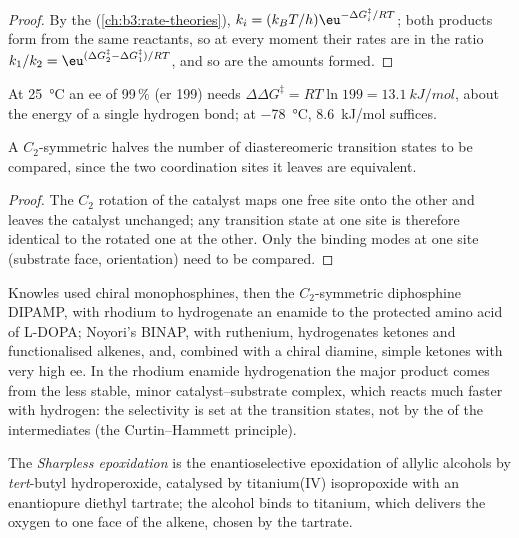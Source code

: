 \begin{proof}
By the  (\cref{ch:b3:rate-theories}),
$k_i = (k_BT/h)\eu^{-\Delta G_i^\ddagger/RT}$; both products form from the same reactants, so at every moment
their rates are in the ratio $k_1/k_2 = \eu^{(\Delta G_2^\ddagger - \Delta G_1^\ddagger)/RT}$, and so are the amounts formed.
\end{proof}

At \qty{25}{\celsius} an ee of 99\,\% (er 199) needs $\Delta\Delta G^\ddagger = RT\ln 199 = \qty{13.1}{kJ/mol}$, about the energy of a
single hydrogen bond; at \qty{-78}{\celsius}, \qty{8.6}{kJ/mol} suffices.

\begin{proposition}\label{prop:b3:asymmetric-synthesis:c2}
A $C_2$-symmetric  halves the number of diastereomeric transition
states to be compared, since the two coordination sites it leaves are
equivalent.
\end{proposition}

\begin{proof}
The $C_2$ rotation of the catalyst maps one free site onto the other and leaves the
catalyst unchanged; any transition state at one site is therefore identical to
the rotated one at the other. Only the binding modes at one site (substrate face,
orientation) need to be compared.
\end{proof}

Knowles used chiral monophosphines, then the $C_2$-symmetric diphosphine DIPAMP, with rhodium to
hydrogenate an enamide to the protected amino acid of L-DOPA; Noyori's BINAP,
with ruthenium, hydrogenates ketones and functionalised alkenes, and,
combined with a chiral diamine, simple ketones with very high ee. In the
rhodium enamide hydrogenation the major product comes from the less stable,
minor catalyst--substrate complex, which reacts much faster with hydrogen: the
selectivity is set at the transition states, not by the  of the
intermediates (the Curtin--Hammett principle).

\begin{definition}\label{def:b3:asymmetric-synthesis:sharpless}
The \emph{Sharpless epoxidation} is the
enantioselective epoxidation of allylic alcohols by \textit{tert}-butyl hydroperoxide,
catalysed by titanium(IV) isopropoxide with an enantiopure diethyl tartrate; the
alcohol binds to titanium, which delivers the oxygen to one face of the
alkene, chosen by the tartrate.
\end{definition}


